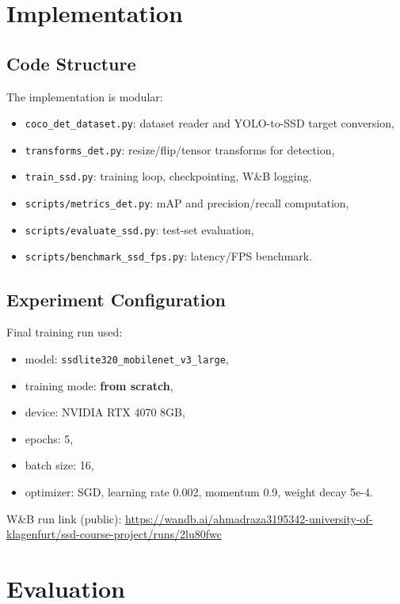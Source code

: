 ﻿\documentclass[11pt]{article}
\begin{document}
\section{Implementation}
\subsection{Code Structure}
The implementation is modular:
\begin{itemize}
    \item \texttt{coco\_det\_dataset.py}: dataset reader and YOLO-to-SSD target conversion,
    \item \texttt{transforms\_det.py}: resize/flip/tensor transforms for detection,
    \item \texttt{train\_ssd.py}: training loop, checkpointing, W\&B logging,
    \item \texttt{scripts/metrics\_det.py}: mAP and precision/recall computation,
    \item \texttt{scripts/evaluate\_ssd.py}: test-set evaluation,
    \item \texttt{scripts/benchmark\_ssd\_fps.py}: latency/FPS benchmark.
\end{itemize}

\subsection{Experiment Configuration}
Final training run used:
\begin{itemize}
    \item model: \texttt{ssdlite320\_mobilenet\_v3\_large},
    \item training mode: \textbf{from scratch},
    \item device: NVIDIA RTX 4070 8GB,
    \item epochs: 5,
    \item batch size: 16,
    \item optimizer: SGD, learning rate 0.002, momentum 0.9, weight decay 5e-4.
\end{itemize}

W\&B run link (public):
\url{https://wandb.ai/ahmadraza3195342-university-of-klagenfurt/ssd-course-project/runs/2lu80fwc}

\section{Evaluation}
\end{document}
